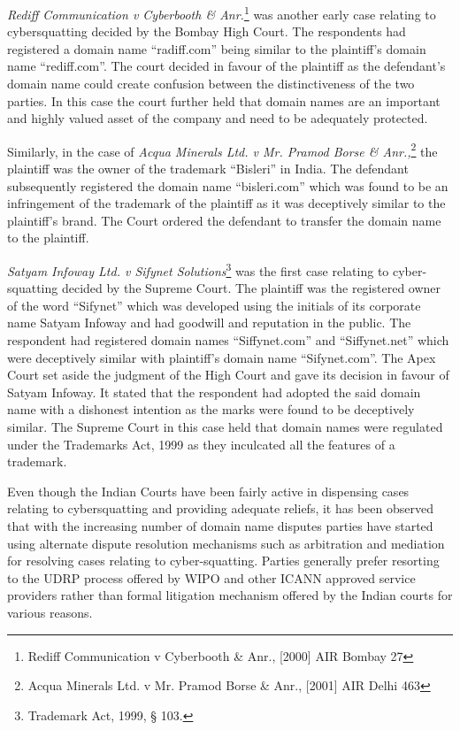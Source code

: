 \begin{multicols}{2}
\noi
\textit{Rediff Communication v Cyberbooth \& Anr.}\footnote{Rediff Communication v Cyberbooth \& Anr., [2000] AIR Bombay 27} was another early case relating to cybersquatting decided by the Bombay High Court. The respondents had registered a domain name
“radiff.com” being similar to the plaintiff’s domain name “rediff.com”. The court decided in
favour of the plaintiff as the defendant’s domain name could create confusion between the
distinctiveness of the two parties. In this case the court further held that domain names are an
important and highly valued asset of the company and need to be adequately protected.

\noi
Similarly, in the case of \textit{Acqua Minerals Ltd. v Mr. Pramod Borse \& Anr.,}\footnote{Acqua Minerals Ltd. v Mr. Pramod Borse \& Anr., [2001] AIR Delhi 463} the plaintiff was
the owner of the trademark “Bisleri” in India. The defendant subsequently registered the
domain name “bisleri.com” which was found to be an infringement of the trademark of the
plaintiff as it was deceptively similar to the plaintiff’s brand. The Court ordered the defendant
to transfer the domain name to the plaintiff.

\noi
\textit{Satyam Infoway Ltd. v Sifynet Solutions}\footnote{Trademark Act, 1999, § 103.} was the first case relating to cyber-squatting decided by the Supreme Court. The plaintiff was the registered owner of the word “Sifynet” which was developed using the initials of its corporate name Satyam Infoway and had
goodwill and reputation in the public. The respondent had registered domain names
“Siffynet.com” and “Siffynet.net” which were deceptively similar with plaintiff’s domain
name “Sifynet.com”. The Apex Court set aside the judgment of the High Court and gave its
decision in favour of Satyam Infoway. It stated that the respondent had adopted the said
domain name with a dishonest intention as the marks were found to be deceptively similar.
The Supreme Court in this case held that domain names were regulated under the Trademarks
Act, 1999 as they inculcated all the features of a trademark.

\noi
Even though the Indian Courts have been fairly active in dispensing cases relating to cybersquatting and providing adequate reliefs, it has been observed that with the increasing number
of domain name disputes parties have started using alternate dispute resolution mechanisms
such as arbitration and mediation for resolving cases relating to cyber-squatting. Parties
generally prefer resorting to the UDRP process offered by WIPO and other ICANN approved service providers rather than formal litigation mechanism offered by the Indian courts for
various reasons.


\end{multicols}
